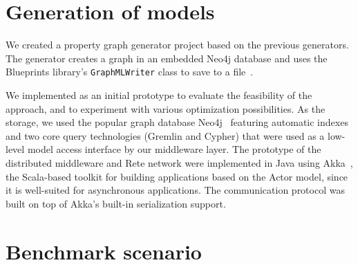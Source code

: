 \section{Generation of models}

We created a property graph generator project based on the previous \tb{} generators. The generator creates a graph in an embedded Neo4j database and uses the Blueprints library's \texttt{GraphMLWriter} class to save to a \graphml{} file~\cite{Blueprints}.



We implemented \iqd{} as an initial prototype to evaluate the feasibility of the approach, and to experiment with various optimization possibilities. As the storage, we used the popular graph database Neo4j~\cite{neo4j} featuring automatic indexes and two core query technologies (Gremlin and Cypher) that were used as a low-level model access interface by our middleware layer.
The prototype of the distributed middleware and Rete network were implemented in Java using Akka~\cite{akka}, the Scala-based toolkit for building applications based on the Actor model, since it is well-suited for asynchronous applications. The communication protocol was built on top of Akka's built-in serialization support.






\section{Benchmark scenario}

